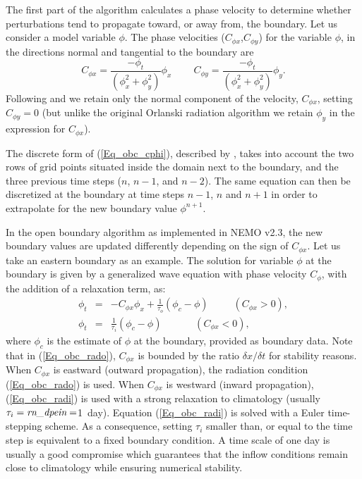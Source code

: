 The first part of the algorithm calculates a phase velocity to determine 
whether perturbations tend to propagate toward, or away from, the 
boundary. Let us consider a model variable $\phi$. 
The phase velocities ($C_{\phi x}$,$C_{\phi y}$) for the variable $\phi$, 
in the directions normal and tangential to the boundary are
\begin{equation} \label{Eq_obc_cphi}
C_{\phi x} = \frac{ -\phi_{t} }{ ( \phi_{x}^{2} + \phi_{y}^{2}) } \phi_{x} 
\;\;\;\;\; \;\;\; 
C_{\phi y} = \frac{ -\phi_{t} }{ ( \phi_{x}^{2} + \phi_{y}^{2}) } \phi_{y}. 
\end{equation}
Following \citet{Treguier_al_JGR01} and \citet{Marchesiello2001} we retain only 
the normal component of the velocity, $C_{\phi x}$, setting $C_{\phi y} =0$ 
(but unlike the original Orlanski radiation algorithm we retain $\phi_{y}$ in 
the expression for $C_{\phi x}$).  

The discrete form of (\ref{Eq_obc_cphi}), described by \citet{Barnier1998},
takes into account the two rows of grid points situated inside the domain 
next to the boundary, and the three previous time steps ($n$, $n-1$,
and $n-2$). The same equation can then be discretized at the boundary at
time steps $n-1$, $n$ and $n+1$  
in order to extrapolate for the new boundary value $\phi^{n+1}$. 

In the open boundary algorithm as implemented in NEMO v2.3, the new boundary 
values are updated differently depending on the sign of $C_{\phi x}$. Let us take 
an eastern boundary as an example. The solution for variable $\phi$ at the 
boundary is given by a generalized wave equation with phase velocity $C_{\phi}$, 
with the addition of a relaxation term, as:
\begin{eqnarray}
\phi_{t} &  =  & -C_{\phi x} \phi_{x} + \frac{1}{\tau_{o}} (\phi_{c}-\phi) 
                        \;\;\; \;\;\; \;\;\; (C_{\phi x} > 0), \label{Eq_obc_rado} \\
\phi_{t} &  =  & \frac{1}{\tau_{i}} (\phi_{c}-\phi) 
\;\;\; \;\;\; \;\;\;\;\;\; (C_{\phi x} < 0), \label{Eq_obc_radi}
\end{eqnarray}
where $\phi_{c}$ is the estimate of $\phi$ at the boundary, provided as boundary 
data. Note that in (\ref{Eq_obc_rado}), $C_{\phi x}$ is bounded by the ratio 
$\delta x/\delta t$ for stability reasons. When $C_{\phi x}$ is eastward (outward 
propagation), the radiation condition (\ref{Eq_obc_rado}) is used. 
When  $C_{\phi x}$ is westward (inward propagation), (\ref{Eq_obc_radi}) is 
used with a strong relaxation to climatology (usually $\tau_{i}=\np{rn\_dpein}=$1~day).
Equation (\ref{Eq_obc_radi}) is solved with a Euler time-stepping scheme. As a 
consequence, setting $\tau_{i}$ smaller than, or equal to the time step is equivalent 
to a fixed boundary condition. A time scale of one day is usually a good compromise 
which guarantees that the inflow conditions remain close to climatology while ensuring 
numerical stability. 

